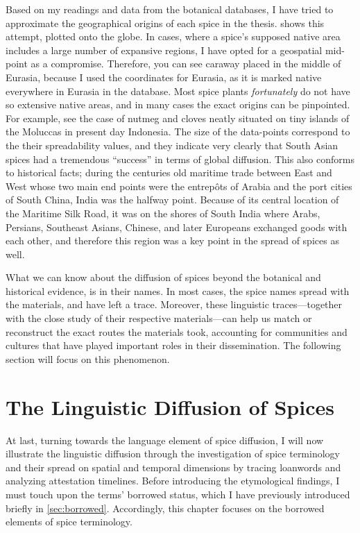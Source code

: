 Based on my readings and data from the botanical databases, I have tried to approximate the geographical origins of each spice in the thesis.  shows this attempt, plotted onto the globe. In cases, where a spice's supposed native area includes a large number of expansive regions, I have opted for a geospatial mid-point as a compromise. Therefore, you can see caraway placed in the middle of Eurasia, because I used the coordinates for Eurasia, as it is marked native everywhere in Eurasia in the database. Most spice plants \textit{fortunately} do not have so extensive native areas, and in many cases the exact origins can be pinpointed. For example, see the case of nutmeg and cloves neatly situated on tiny islands of the Moluccas in present day Indonesia. %
The size of the data-points correspond to the their spreadability values, and they indicate very clearly that South Asian spices had a tremendous ``success'' in terms of global diffusion. This also conforms to historical facts; during the centuries old maritime trade between East and West whose two main end points were the entrepôts of Arabia and the port cities of South China, India was the halfway point. Because of its central location of the Maritime Silk Road, it was on the shores of South India where Arabs, Persians, Southeast Asians, Chinese, and later Europeans exchanged goods with each other, and therefore this region was a key point in the spread of spices as well.

What we can know about the diffusion of spices beyond the botanical and historical evidence, is in their names. In most cases, the spice names spread with the materials, and have left a trace. Moreover, these linguistic traces---together with the close study of their respective materials---can help us match or reconstruct the exact routes the materials took, accounting for communities and cultures that have played important roles in their dissemination. The following section will focus on this phenomenon.

\section{The Linguistic Diffusion of Spices}
\label{linguistic_diffusion}

At last, turning towards the language element of spice diffusion, I will now illustrate the linguistic diffusion through the investigation of spice terminology and their spread on spatial and temporal dimensions by tracing loanwords and analyzing attestation timelines. Before introducing the etymological findings, I must touch upon the terms' borrowed status, which I have previously introduced briefly in \cref{sec:borrowed}. Accordingly, this chapter focuses on the borrowed elements of spice terminology.

